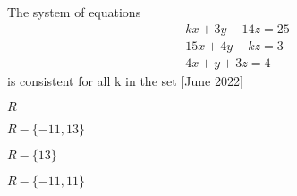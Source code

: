         \bigskip
    \item The system of equations
    \begin{align*}
        -kx+3y-14z=25\\
        -15x+4y-kz=3\\
        -4x+y+3z=4
    \end{align*}
    is consistent for all k in the set  \hfill{[June 2022]}
    \begin{enumerate}
        \begin{multicols}{4}
        \item $R$
        \item $R-\{-11,13\}$
        \item $R-\{13\}$
        \item $R-\{-11,11\}$
        \end{multicols}
        \end{enumerate}
\bigskip
 
